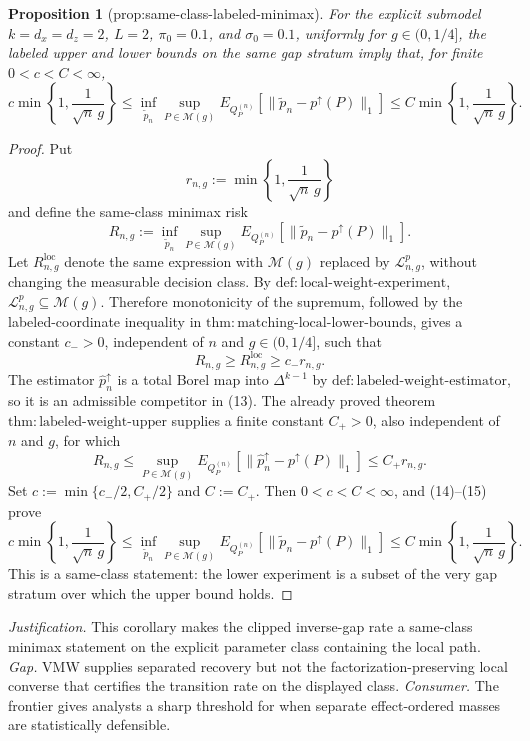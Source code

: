 \documentclass{article}
\newtheorem{proposition}{Proposition}
\begin{document}
\begin{proposition}[prop:same-class-labeled-minimax]\label{prop:same-class-labeled-minimax}
For the explicit submodel \(k=d_x=d_z=2\), \(L=2\), \(\pi_0=0.1\), and \(\sigma_0=0.1\), uniformly for \(g\in(0,1/4]\), the labeled upper and lower bounds on the same gap stratum imply that, for finite \(0<c<C<\infty\),
\[
c\min\left\{1,\frac{1}{\sqrt n\,g}\right\}\le\inf_{\widetilde p_n}\sup_{P\in\mathcal M(g)}E_{Q_P^{(n)}}[\lVert\widetilde p_n-p^{\uparrow}(P)\rVert_1]\le C\min\left\{1,\frac{1}{\sqrt n\,g}\right\}.
\]
\end{proposition}
\begin{proof}
Put
\[
r_{n,g}:=\min\left\{1,\frac1{\sqrt n\,g}\right\}
\]
and define the same-class minimax risk
\[
R_{n,g}:=\inf_{\widetilde p_n}\sup_{P\in\mathcal M(g)}
E_{Q_P^{(n)}}\!\left[
\lVert\widetilde p_n-p^{\uparrow}(P)\rVert_1\right].                       \tag{13}
\]
Let \(R_{n,g}^{\mathrm{loc}}\) denote the same expression with \(\mathcal M(g)\) replaced by \(\mathcal L_{n,g}^{p}\), without changing the measurable decision class.  By \(\mathrm{def:local\text{-}weight\text{-}experiment}\),
\(\mathcal L_{n,g}^{p}\subseteq\mathcal M(g)\).  Therefore monotonicity of the supremum, followed by the labeled-coordinate inequality in \(\mathrm{thm:matching\text{-}local\text{-}lower\text{-}bounds}\), gives a constant \(c_->0\), independent of \(n\) and \(g\in(0,1/4]\), such that
\[
R_{n,g}\ge R_{n,g}^{\mathrm{loc}}\ge c_-r_{n,g}.                          \tag{14}
\]
The estimator \(\widehat p_n^{\uparrow}\) is a total Borel map into \(\Delta^{k-1}\) by \(\mathrm{def:labeled\text{-}weight\text{-}estimator}\), so it is an admissible competitor in (13).  The already proved theorem \(\mathrm{thm:labeled\text{-}weight\text{-}upper}\) supplies a finite constant \(C_+>0\), also independent of \(n\) and \(g\), for which
\[
R_{n,g}
\le\sup_{P\in\mathcal M(g)}E_{Q_P^{(n)}}\!\left[
\lVert\widehat p_n^{\uparrow}-p^{\uparrow}(P)\rVert_1\right]
\le C_+r_{n,g}.                                                             \tag{15}
\]
Set \(c:=\min\{c_-/2,C_+/2\}\) and \(C:=C_+\).  Then \(0<c<C<\infty\), and (14)--(15) prove
\[
c\min\left\{1,\frac1{\sqrt n\,g}\right\}
\le\inf_{\widetilde p_n}\sup_{P\in\mathcal M(g)}
E_{Q_P^{(n)}}\!\left[
\lVert\widetilde p_n-p^{\uparrow}(P)\rVert_1\right]
\le C\min\left\{1,\frac1{\sqrt n\,g}\right\}.
\]
This is a same-class statement: the lower experiment is a subset of the very gap stratum over which the upper bound holds.
\end{proof}
\par\smallskip\noindent \textit{Justification.} This corollary makes the clipped inverse-gap rate a same-class minimax statement on the explicit parameter class containing the local path. \textit{Gap.} VMW supplies separated recovery but not the factorization-preserving local converse that certifies the transition rate on the displayed class. \textit{Consumer.} The frontier gives analysts a sharp threshold for when separate effect-ordered masses are statistically defensible.
\end{document}

